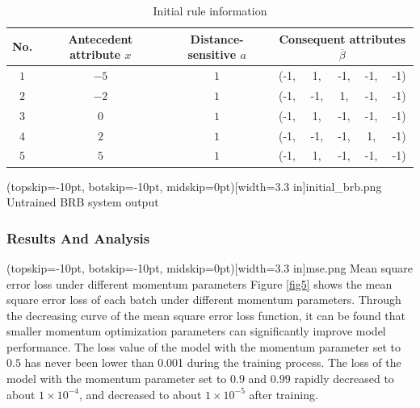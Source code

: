 \documentclass{ieeeaccess}
\begin{document}
\begin{table}
    \caption{Initial rule information}
    \centering
    \normalsize
    \label{tab1}
    \begin{tabular}{cccccccc}
        \hline
        No. & Antecedent attribute $x$ & Distance-sensitive $a$ & \multicolumn{5}{c}{Consequent attributes $\overline{\beta}$}                         \\
        \hline
        $1$ & $-5$                     & $1$                    & (-1,                                                         & 1,  & -1, & -1, & -1) \\
        $2$ & $-2$                     & $1$                    & (-1,                                                         & -1, & 1,  & -1, & -1) \\
        $3$ & $0$                      & $1$                    & (-1,                                                         & 1,  & -1, & -1, & -1) \\
        $4$ & $2$                      & $1$                    & (-1,                                                         & -1, & -1, & 1,  & -1) \\
        $5$ & $5$                      & $1$                    & (-1,                                                         & 1,  & -1, & -1, & -1) \\
        \hline
    \end{tabular}
\end{table}

\Figure[!t](topskip=-10pt, botskip=-10pt, midskip=0pt)[width=3.3 in]{initial_brb.png}
{Untrained BRB system output\label{fig4}}

\subsubsection{Results And Analysis}
\Figure[!t](topskip=-10pt, botskip=-10pt, midskip=0pt)[width=3.3 in]{mse.png}
{Mean square error loss under different momentum parameters\label{fig5}}
Figure \ref{fig5} shows the mean square error loss of each batch under different momentum parameters.
Through the decreasing curve of the mean square error loss function,
it can be found that smaller momentum optimization parameters can significantly improve model performance.
The loss value of the model with the momentum parameter set to $0.5$ has never been lower than 0.001 during the training process.
The loss of the model with the momentum parameter set to $0.9$ and $0.99$ rapidly decreased to about $1\times10^{-4}$,
and decreased to about $1\times10^{-5}$ after training.
\end{document}

